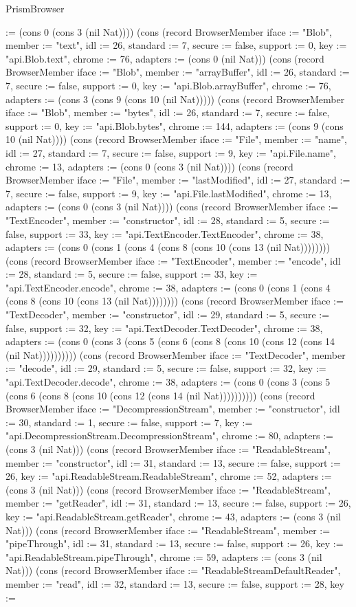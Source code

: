 \begin{lexlean}{PrismBrowser}
\begin{semanticmodule}
{:= (cons 0 (cons 3 (nil Nat)))}) (cons (record BrowserMember {iface := "Blob", member := "text", idl := 26, standard := 7, secure := false, support := 0, key := "api.Blob.text", chrome := 76, adapters := (cons 0 (nil Nat))}) (cons (record BrowserMember {iface := "Blob", member := "arrayBuffer", idl := 26, standard := 7, secure := false, support := 0, key := "api.Blob.arrayBuffer", chrome := 76, adapters := (cons 3 (cons 9 (cons 10 (nil Nat))))}) (cons (record BrowserMember {iface := "Blob", member := "bytes", idl := 26, standard := 7, secure := false, support := 0, key := "api.Blob.bytes", chrome := 144, adapters := (cons 9 (cons 10 (nil Nat)))}) (cons (record BrowserMember {iface := "File", member := "name", idl := 27, standard := 7, secure := false, support := 9, key := "api.File.name", chrome := 13, adapters := (cons 0 (cons 3 (nil Nat)))}) (cons (record BrowserMember {iface := "File", member := "lastModified", idl := 27, standard := 7, secure := false, support := 9, key := "api.File.lastModified", chrome := 13, adapters := (cons 0 (cons 3 (nil Nat)))}) (cons (record BrowserMember {iface := "TextEncoder", member := "constructor", idl := 28, standard := 5, secure := false, support := 33, key := "api.TextEncoder.TextEncoder", chrome := 38, adapters := (cons 0 (cons 1 (cons 4 (cons 8 (cons 10 (cons 13 (nil Nat)))))))}) (cons (record BrowserMember {iface := "TextEncoder", member := "encode", idl := 28, standard := 5, secure := false, support := 33, key := "api.TextEncoder.encode", chrome := 38, adapters := (cons 0 (cons 1 (cons 4 (cons 8 (cons 10 (cons 13 (nil Nat)))))))}) (cons (record BrowserMember {iface := "TextDecoder", member := "constructor", idl := 29, standard := 5, secure := false, support := 32, key := "api.TextDecoder.TextDecoder", chrome := 38, adapters := (cons 0 (cons 3 (cons 5 (cons 6 (cons 8 (cons 10 (cons 12 (cons 14 (nil Nat)))))))))}) (cons (record BrowserMember {iface := "TextDecoder", member := "decode", idl := 29, standard := 5, secure := false, support := 32, key := "api.TextDecoder.decode", chrome := 38, adapters := (cons 0 (cons 3 (cons 5 (cons 6 (cons 8 (cons 10 (cons 12 (cons 14 (nil Nat)))))))))}) (cons (record BrowserMember {iface := "DecompressionStream", member := "constructor", idl := 30, standard := 1, secure := false, support := 7, key := "api.DecompressionStream.DecompressionStream", chrome := 80, adapters := (cons 3 (nil Nat))}) (cons (record BrowserMember {iface := "ReadableStream", member := "constructor", idl := 31, standard := 13, secure := false, support := 26, key := "api.ReadableStream.ReadableStream", chrome := 52, adapters := (cons 3 (nil Nat))}) (cons (record BrowserMember {iface := "ReadableStream", member := "getReader", idl := 31, standard := 13, secure := false, support := 26, key := "api.ReadableStream.getReader", chrome := 43, adapters := (cons 3 (nil Nat))}) (cons (record BrowserMember {iface := "ReadableStream", member := "pipeThrough", idl := 31, standard := 13, secure := false, support := 26, key := "api.ReadableStream.pipeThrough", chrome := 59, adapters := (cons 3 (nil Nat))}) (cons (record BrowserMember {iface := "ReadableStreamDefaultReader", member := "read", idl := 32, standard := 13, secure := false, support := 28, key := }
\end{semanticmodule}
\end{lexlean}
